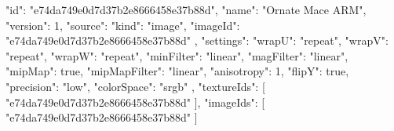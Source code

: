 {
  "id": "e74da749e0d7d37b2e8666458e37b88d",
  "name": "Ornate Mace ARM",
  "version": 1,
  "source": {
    "kind": "image",
    "imageId": "e74da749e0d7d37b2e8666458e37b88d"
  },
  "settings": {
    "wrapU": "repeat",
    "wrapV": "repeat",
    "wrapW": "repeat",
    "minFilter": "linear",
    "magFilter": "linear",
    "mipMap": true,
    "mipMapFilter": "linear",
    "anisotropy": 1,
    "flipY": true,
    "precision": "low",
    "colorSpace": "srgb"
  },
  "textureIds": [
    "e74da749e0d7d37b2e8666458e37b88d"
  ],
  "imageIds": [
    "e74da749e0d7d37b2e8666458e37b88d"
  ]
}
